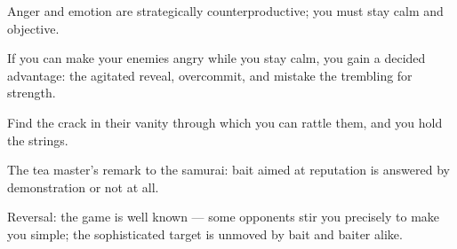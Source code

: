 

\begin{distilled}
  \item Anger and emotion are strategically counterproductive; you must stay calm and objective.
  \item If you can make your enemies angry while you stay calm, you gain a decided advantage: the agitated reveal, overcommit, and mistake the trembling for strength.
  \item Find the crack in their vanity through which you can rattle them, and you hold the strings.
  \item The tea master's remark to the samurai: bait aimed at reputation is answered by demonstration or not at all.
  \item Reversal: the game is well known --- some opponents stir you precisely to make you simple; the sophisticated target is unmoved by bait and baiter alike.
\end{distilled}
